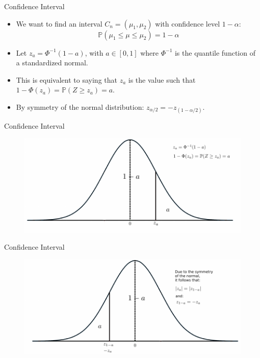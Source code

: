 \documentclass[handout]{beamer}
\begin{document}
\begin{frame}{Confidence Interval}
\scriptsize{
\begin{itemize}
 \item We want to find an interval $C_n = (\mu_1,\mu_2)$ with confidence level $1-\alpha$:
\begin{displaymath}
 \mathbb{P}(\mu_1 \leq \mu \leq \mu_2 ) = 1-\alpha
\end{displaymath}
\item Let $z_a = \Phi^{-1}(1-a)$, with $a \in [0,1]$ where $\Phi^{-1}$ is the quantile function of a standardized normal.
\item This is equivalent to saying that $z_a$ is the value such that $1-\Phi(z_a)=\mathbb{P}(Z \geq z_a)=a$.

\item By symmetry of the normal distribution: $z_{\alpha/2}=-z_{(1-\alpha/2)}$.
\end{itemize}


 }
\end{frame}



\begin{frame}{Confidence Interval}


\begin{figure}[h!]
	\centering
	\includegraphics[scale=0.8]{pics/conf_int_1.pdf}
\end{figure}


 
\end{frame}


\begin{frame}{Confidence Interval}


\begin{figure}[h!]
	\centering
	\includegraphics[scale=0.8]{pics/conf_int_2.pdf}
\end{figure}


 
\end{frame}
\end{document}
